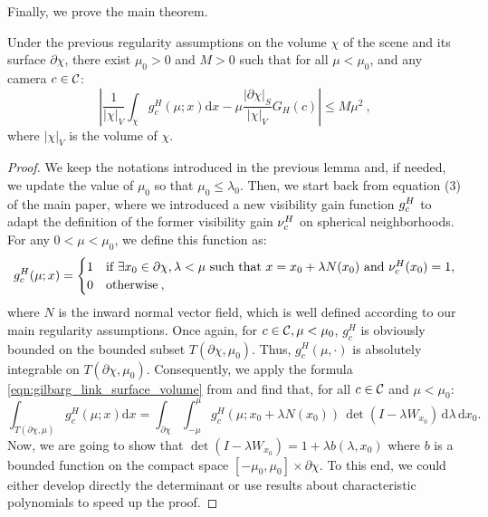 Finally, we prove the main theorem.
%
\begin{T1}
    Under the previous regularity assumptions on the volume $\chi$ of the scene and its surface $\partial\chi$, there exist $\mu_0 > 0$ and $M>0$ such that for all $\mu < \mu_0$, and any camera $c\in {\cal C}$:
    \begin{equation}
         \left| \frac{1}{|\chi|_V}\int_{\chi}  g_c^H(\mu;x) \text{d}x -  \mu \frac{|\partial\chi|_S}{|\chi|_V} G_H(c) \right| \leq M \mu^2 \> ,
    \end{equation}
    where $|\chi|_V$ is the volume of $\chi$.%
\end{T1}
%
\begin{proof}
We keep the notations introduced in the previous lemma and, if needed, we update the value of $\mu_0$ so that $\mu_0 \leq \lambda_0$. Then, we start back from equation (3) of the main paper, where we introduced a new visibility gain function $g_c^H$ to adapt the definition of the former visibility gain $\nu_c^H$ on spherical neighborhoods. For any $0<\mu<\mu_0$, we define this function as:
%
\begin{equation}
        g_{c}^H(\mu; x) = 
        \begin{cases}
            1 & \text{if } \exists x_0 \in \partial\chi, \lambda <\mu \text{ such that } x = x_0 + \lambda N(x_0) \text{ and } \nu_c^H(x_0) = 1,\\
            0 & \text{otherwise} \> ,
        \end{cases}
\end{equation}
%
where $N$ is the inward normal vector field, which is well defined according to our main regularity assumptions. Once again, for $c\in{\cal C}, \mu < \mu_0$, $g_c^{H}$ is obviously bounded on the bounded subset $T(\partial\chi, \mu_0)$. Thus, $g_c^{H}(\mu,\cdot)$ is absolutely integrable on $T(\partial\chi, \mu_0)$. Consequently, we apply the formula \ref{eqn:gilbarg_link_surface_volume} from \cite{gilbarg} and find that, for all $c \in {\cal C}$ and $\mu < \mu_0$:
%
\begin{equation}
    \label{eqn:link_volume_surface_appendix}
    \int_{T(\partial\chi, \mu)}  g_c^H(\mu; x) \text{d}x
    = \int_{\partial\chi} \int_{-\mu}^\mu g_c^H(\mu; x_0 + \lambda N(x_0))\,\det(I-\lambda W_{x_0})\,\text{d}\lambda\,\text{d}x_0.
\end{equation}
%
Now, we are going to show that $\det(I - \lambda W_{x_0}) = 1 + \lambda b(\lambda, x_0)$ where $b$ is a bounded function on the compact space $[-\mu_0, \mu_0] \times \partial \chi$. To this end, we could either develop directly the determinant or use results about characteristic polynomials to speed up the proof. 


\end{proof}
